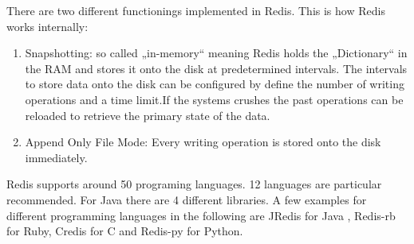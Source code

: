 There are two different functionings implemented in Redis. This is how Redis works internally:
\begin{enumerate}
\item Snapshotting: so called „in-memory“ meaning Redis holds the „Dictionary“ in the RAM and stores it onto the disk at predetermined intervals. The intervals to store data onto the disk can be configured by define the number of writing operations and a time limit.If the systems crushes the past operations can be reloaded to retrieve the primary state of the data.
\item Append Only File Mode: Every writing operation is stored onto the disk immediately.
\end{enumerate}

Redis supports around 50 programing languages. 12 languages are particular recommended. For Java there are 4 different libraries. A few examples for different programming languages in the following are JRedis for Java , Redis-rb for Ruby, Credis for C and Redis-py for Python.